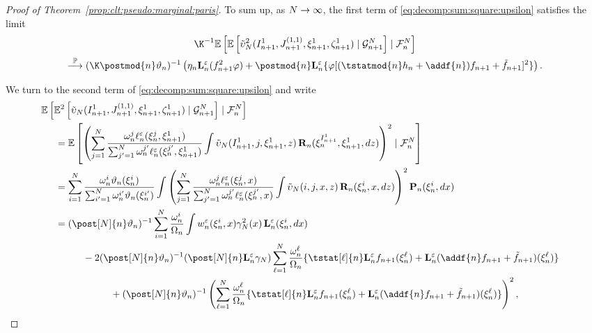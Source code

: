 \begin{proof}[Proof of Theorem~\ref{prop:clt:pseudo:marginal:paris}]
To sum up, as $N \to \infty$, the first term of \eqref{eq:decomp:sum:square:upsilon} satisfies the limit 
\begin{multline} \label{eq:limit:first:term:i}
\K^{-1} \pE \left[ \pE \left[\tilde{\upsilon}_\N^2(I_{n + 1}^1, J_{n + 1}^{(1,1)}, \epart{n + 1}{1}, \zpart{n + 1}{1}) \cond \calG{n + 1}{\N} \right] \cond \calF{n}{\N} \right] \\
\pplim (\K \postmod{n} \adjfuncforward{n})^{-1} \left( \eta_n \ukmod{n}(f^2_{n + 1} \varphi) + \postmod{n} \ukmod{n} \{ \varphi [(\tstatmod{n} h_n + \addf{n}) f_{n+1} + \ftd{n + 1}]^2 \} \right). 
\end{multline}

We turn to the second term of \eqref{eq:decomp:sum:square:upsilon} and write 
\begin{align*}
\lefteqn{\pE \left[ \pE^2 \left[ \tilde{\upsilon}_\N(I_{n + 1}^1, J_{n + 1}^{(1,1)}, \epart{n + 1}{1}, \zpart{n + 1}{1}) \cond \calG{n + 1}{\N} \right] \cond \calF{n}{\N} \right]} \hspace{5mm} \\
&= \pE\left[ \left( \sum_{j = 1}^\N \frac{\ewght{n}{j} \udmod{n}(\epart{n}{j}, \epart{n + 1}{1})}{\sum_{j' = 1}^\N \ewght{n}{j'} \udmod{n}(\epart{n}{j'}, \epart{n + 1}{1}) } \int \tilde{\upsilon}_\N(\ind{n + 1}{1}, j, \epart{n + 1}{1}, z) \, \ukdist{n}(\epart{n}{\ind{n + 1}{1}}, \epart{n + 1}{1}, \rmd z) \right)^2 \cond \calF{n}{\N}\right] \\
&= \sum_{i = 1}^{\N}  \frac{\ewght{n}{i} \adjfuncforward{n}(\epart{n}{i})}{\sum_{i' = 1}^\N \ewght{n}{i'}\adjfuncforward{n}(\epart{n}{i'})} \int \left( \sum_{j = 1}^\N \frac{\ewght{n}{j} \udmod{n} (\epart{n}{j}, x)}{\sum_{j' = 1}^{\N} \ewght{n}{j'} \udmod{n}(\epart{n}{j'}, x)} \int \tilde{\upsilon}_\N(i, j, x, z) \, \ukdist{n}(\epart{n}{i}, x, \rmd z)\right)^2 
\prop{n}(\epart{n}{i}, \rmd x) \\
&= (\post[\N]{n} \adjfuncforward{n})^{-1} \sum_{i = 1}^\N \frac{\ewght{n}{i}}{\sumwght{n}} \int \wgtfuncmod{n}(\epart{n}{i}, x) \gamma_\N^2(x) \, \ukmod{n}(\epart{n}{i}, \rmd x) \\ 
&\hspace{10mm} - 2 (\post[\N]{n} \adjfuncforward{n})^{-1} (\post[\N]{n} \ukmod{n} \gamma_\N) \sum_{\ell = 1}^\N \frac{\ewght{n}{\ell}}{\sumwght{n}} \{ \tstat[\ell]{n} \ukmod{n} f_{n + 1}(\epart{n}{\ell}) + \ukmod{n}(\addf{n} f_{n + 1} + \ftd{n + 1})(\epart{n}{\ell}) \} \\
&\hspace{20mm} + (\post[\N]{n} \adjfuncforward{n})^{-1} \left( \sum_{\ell = 1}^\N \frac{\ewght{n}{\ell}}{\sumwght{n}} \{ \tstat[\ell]{n} \ukmod{n} f_{n + 1}(\epart{n}{\ell}) + \ukmod{n}(\addf{n} f_{n + 1} + \ftd{n + 1})(\epart{n}{\ell})\} \right)^2, 

\end{align*}
\end{proof}

